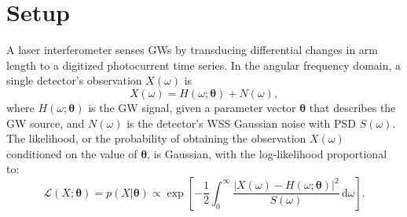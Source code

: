 \documentclass{iopart}
\begin{document}
\section{Setup}

A laser interferometer senses \acp{GW} by transducing differential changes in arm length to a digitized photocurrent time series. In the angular frequency domain, a single detector's observation $X(\omega)$ is
%
\begin{equation}\label{eq:signal-model}
	X (\omega) = H (\omega; \boldsymbol\theta) + N (\omega),
\end{equation}
%
where $H (\omega; \boldsymbol\theta)$ is the \ac{GW} signal, given a parameter vector $\boldsymbol\theta$ that describes the \ac{GW} source, and $N (\omega)$ is the detector's \ac{WSS} Gaussian noise with \ac{PSD} $S(\omega)$. The likelihood, or the probability of obtaining the observation $X(\omega)$ conditioned on the value of $\boldsymbol\theta$, is Gaussian, with the log\nobreakdashes-likelihood proportional to:
%
\begin{equation}\label{eq:gaussian-likelihood}
	\mathcal{L}(X; \boldsymbol\theta) = p(X | \boldsymbol\theta)
		\propto \exp \left[
		- \frac{1}{2} \int_0^\infty \frac{\left|X (\omega)
			- H(\omega; \boldsymbol\theta) \right|^2}{S(\omega)} \, \mathrm{d}\omega
	\right].
\end{equation}
\end{document}
